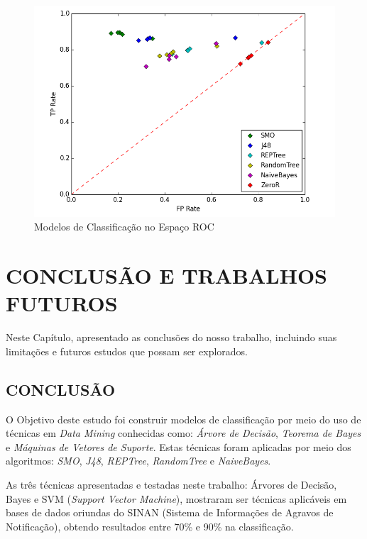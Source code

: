 \documentclass[
	12pt,				%
	openright,			%
	oneside,	
	a4paper,				%
	english,				%
	brazil				%
]{abntex2/abntex2} %
\begin{document}
	\begin{figure}[!htb]
		\caption{\label{figTodosModelos} Modelos de Classificação no Espaço ROC}
		\begin{center}
			\includegraphics[scale=0.8]{python/TodosModelos.png}
		\end{center}
	\end{figure}
	
\chapter{CONCLUSÃO E TRABALHOS FUTUROS}

	Neste Capítulo, apresentado as conclusões do nosso trabalho, incluindo suas limitações  e futuros estudos que possam ser explorados. 

	\section{CONCLUSÃO}

	O Objetivo deste estudo foi construir modelos de classificação por meio do uso de técnicas em \textit{Data Mining} conhecidas como: \textit{Árvore de Decisão}, \textit{Teorema de Bayes} e \textit{Máquinas de Vetores de Suporte}. Estas técnicas foram aplicadas por meio dos algoritmos: \textit{SMO}, \textit{J48}, \textit{REPTree}, \textit{RandomTree} e \textit{NaiveBayes}.
	
	As três técnicas apresentadas e testadas neste trabalho: Árvores de Decisão, Bayes e SVM (\textit{Support Vector Machine}), mostraram ser técnicas aplicáveis em bases de dados oriundas do SINAN (Sistema de Informações de Agravos de Notificação), obtendo resultados entre 70\% e 90\% na classificação.
	
\end{document}

